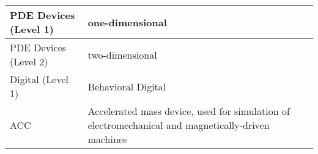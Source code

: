 \begin{longtable}[h] {>{\raggedright\small}m{2in}|>{\raggedright\let\\\tabularnewline\small}m{3.5in}}
    PDE Devices (Level 1) & one-dimensional\\ \hline

    PDE Devices (Level 2) & two-dimensional\\ \hline

    Digital (Level 1)  & Behavioral Digital \\ \hline

    ACC & Accelerated mass device, used for simulation of electromechanical and magnetically-driven machines \\ \hline

\end{longtable}

